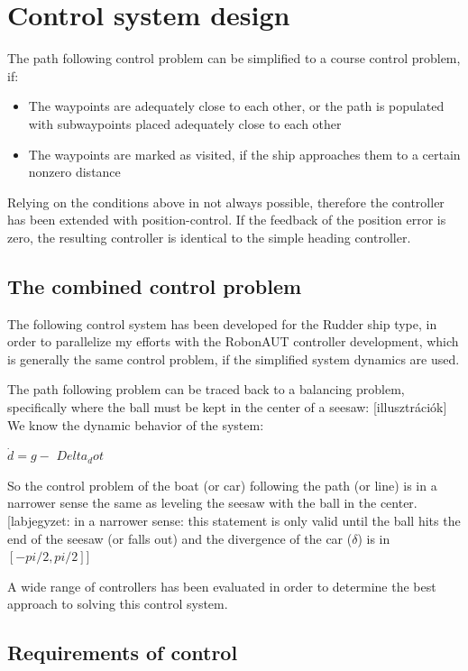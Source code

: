 \section{Control system design}

The path following control problem can be simplified to a course control problem, if:

\begin{itemize}

	\item The waypoints are adequately close to each other, or the path is populated with subwaypoints placed adequately close to each other
	\item The waypoints are marked as visited, if the ship approaches them to a certain nonzero distance

\end{itemize}

Relying on the conditions above in not always possible, therefore the controller has been extended with position-control. If the feedback of the position error is zero, the resulting controller is identical to the simple heading controller.

\subsection{The combined control problem}

The following control system has been developed for the Rudder ship type, in order to parallelize my efforts with the RobonAUT controller development, which is generally the same control problem, if the simplified system dynamics are used.

The path following problem can be traced back to a balancing problem, specifically where the ball must be kept in the center of a seesaw: [illusztrációk]
We know the dynamic behavior of the system:

$\dot{d} = g-$
$Delta_dot$

So the control problem of the boat (or car) following the path (or line) is in a narrower sense the same as leveling the seesaw with the ball in the center. [labjegyzet: in a narrower sense: this statement is only valid until the ball hits the end of the seesaw (or falls out) and the divergence of the car ($\delta$) is in $[-pi/2, pi/2]$]

A wide range of controllers has been evaluated in order to determine the best approach to solving this control system.

\subsection{Requirements of control}

